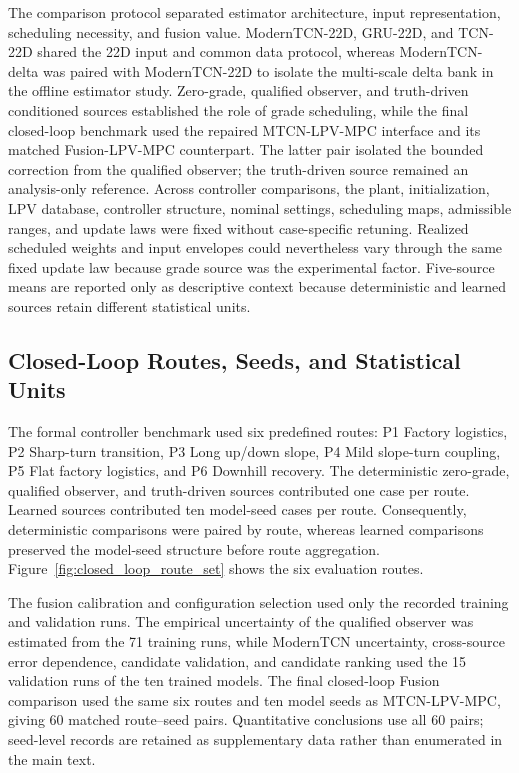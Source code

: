 \documentclass{ieeeaccess}
\begin{document}
The comparison protocol separated estimator architecture, input representation, scheduling necessity, and fusion value. ModernTCN-22D, GRU-22D, and TCN-22D shared the 22D input and common data protocol, whereas ModernTCN-delta was paired with ModernTCN-22D to isolate the multi-scale delta bank in the offline estimator study. Zero-grade, qualified observer, and truth-driven conditioned sources established the role of grade scheduling, while the final closed-loop benchmark used the repaired MTCN-LPV-MPC interface and its matched Fusion-LPV-MPC counterpart. The latter pair isolated the bounded correction from the qualified observer; the truth-driven source remained an analysis-only reference. Across controller comparisons, the plant, initialization, LPV database, controller structure, nominal settings, scheduling maps, admissible ranges, and update laws were fixed without case-specific retuning. Realized scheduled weights and input envelopes could nevertheless vary through the same fixed update law because grade source was the experimental factor. Five-source means are reported only as descriptive context because deterministic and learned sources retain different statistical units.

\subsection{Closed-Loop Routes, Seeds, and Statistical Units}

The formal controller benchmark used six predefined routes: P1 Factory logistics, P2 Sharp-turn transition, P3 Long up/down slope, P4 Mild slope-turn coupling, P5 Flat factory logistics, and P6 Downhill recovery. The deterministic zero-grade, qualified observer, and truth-driven sources contributed one case per route. Learned sources contributed ten model-seed cases per route. Consequently, deterministic comparisons were paired by route, whereas learned comparisons preserved the model-seed structure before route aggregation. Figure~\ref{fig:closed_loop_route_set} shows the six evaluation routes.

The fusion calibration and configuration selection used only the recorded training and validation runs. The empirical uncertainty of the qualified observer was estimated from the 71 training runs, while ModernTCN uncertainty, cross-source error dependence, candidate validation, and candidate ranking used the 15 validation runs of the ten trained models. The final closed-loop Fusion comparison used the same six routes and ten model seeds as MTCN-LPV-MPC, giving 60 matched route--seed pairs. Quantitative conclusions use all 60 pairs; seed-level records are retained as supplementary data rather than enumerated in the main text.
\end{document}
